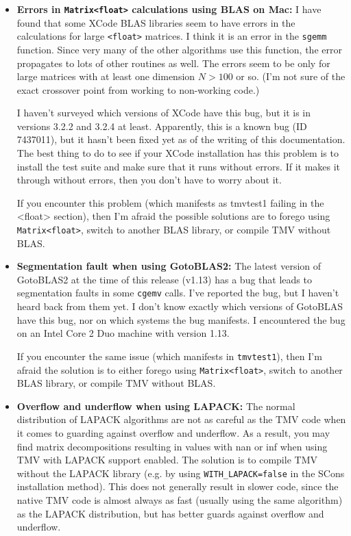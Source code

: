 \documentclass[twoside,letterpaper,11pt]{article}
\renewcommand{\tt}[1]{{\lstinline {#1}}}
\begin{document}
\begin{itemize}
\item {\bf Errors in \tt{Matrix<float>} calculations using BLAS on Mac:}
\index{Bugs!Wrong answers in \tt{Matrix<float>} when using XCode BLAS on Mac}
I have found that some XCode BLAS libraries seem to have errors in the 
calculations for large \tt{<float>} matrices.  I think it is an error in the \tt{sgemm}
function.  Since very many of the other algorithms use this function, the error
propagates to lots of other routines as well.  The errors seem to be only for
large matrices with at least one dimension $N > 100$ or so.  (I'm not sure of the 
exact crossover point from working to non-working code.)

I haven't surveyed which versions of XCode have this bug, but it is in versions
3.2.2 and 3.2.4 at least.  
Apparently, this is a known bug (ID 7437011), but it hasn't been fixed yet
as of the writing of this documentation. 
The best thing to do to see if your XCode installation has this problem
is to install the test suite and make sure that it runs without errors.  If it makes it 
through without errors, then you don't have to worry about it.

If you encounter this problem (which manifests as tmvtest1 failing in the <float> section),
then I'm afraid the possible solutions are to forego using \tt{Matrix<float>}, switch to another
BLAS library, or compile TMV without BLAS.

\item {\bf Segmentation fault when using GotoBLAS2:}
The latest version of GotoBLAS2 at the time of this release (v1.13) has a bug that leads to segmentation
faults in some \tt{cgemv} calls.  I've reported the bug, but I haven't heard back from
them yet. I don't know exactly which versions of GotoBLAS have this bug, nor on which systems the bug manifests.  I encountered the bug on an Intel Core 2 Duo machine with version 1.13.

If you encounter the same issue (which manifests in \tt{tmvtest1}), then I'm afraid the solution is to either forego using \tt{Matrix<float>}, switch to another BLAS library, or compile TMV without BLAS.

\item {\bf Overflow and underflow when using LAPACK:}
The normal distribution of LAPACK algorithms are not as careful as the TMV code when 
it comes to guarding against overflow and underflow.  As a result, you may find
matrix decompositions resulting in values with nan or inf when using TMV
with LAPACK support enabled.  The solution is to compile TMV without the LAPACK
library (e.g. by using \tt{WITH_LAPACK=false} in the SCons installation method).
This does not generally result in slower code, since the native TMV code is almost always
as fast (usually using the same algorithm) as the LAPACK distribution, but has better
guards against overflow and underflow.


\end{itemize}
\end{document}
